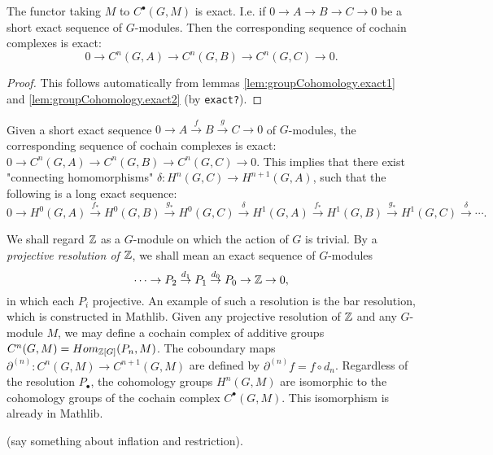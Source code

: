 \begin{lemma}
  The functor taking $M$ to $C^\bullet (G,M)$ is exact.
  I.e. if $0 \to A \to B \to C \to 0$ be a short exact sequence of $G$-modules.
  Then the corresponding sequence of cochain complexes is exact:
  \[
    0 \to C^n(G,A) \to C^n(G,B) \to C^n(G,C) \to 0.
  \]
\end{lemma}

\begin{proof}
  This follows automatically from lemmas \ref{lem:groupCohomology.exact1}
  and \ref{lem:groupCohomology.exact2} (by \texttt{exact?}).
\end{proof}


\begin{definition}
  Given a short exact sequence $0 \to A \stackrel{f}\to B \stackrel{g}\to C \to 0$ of $G$-modules,
  the corresponding sequence of cochain complexes is exact:
  $0 \to C^n(G,A) \to C^n(G,B) \to C^n(G,C) \to 0$.
  This implies that there exist "connecting homomorphisms" $\delta : H^n(G,C) \to H^{n+1}(G,A)$,
  such that the following is a long exact sequence:
  \[
    0 \to H^0(G,A) \stackrel{f_*}\to H^0(G,B) \stackrel{g_*}\to H^0(G,C) \stackrel{\delta}\to
    H^1(G,A) \stackrel{f_*}\to H^1(G,B) \stackrel{g_*} \to H^1(G,C) \stackrel{\delta}\to \cdots.
  \]
\end{definition}



We shall regard ${\mathbb Z}$ as a $G$-module on which the action of $G$ is trivial.
By a \emph{projective resolution of ${\mathbb Z}$}, we shall mean an exact sequence of $G$-modules
\[
  \cdots \to P_2 \stackrel{d_1}\to P_1 \stackrel{d_0}\to P_0 \to {\mathbb Z} \to 0,
\]
in which each $P_i$ projective.
An example of such a resolution is the bar resolution,
which is constructed in Mathlib.
Given any projective resolution of ${\mathbb Z}$ and any $G$-module $M$, we may define a cochain
complex of additive groups $C^n(G,M) = Hom_{{\mathbb Z}[G]}(P_n,M)$. The coboundary maps
$\partial^{(n)} : C^n(G,M) \to C^{n+1}(G,M)$ are defined by $\partial^{(n)} f = f \circ d_n$.
Regardless of the resolution $P_\bullet$,
the cohomology groups $H^n(G,M)$ are isomorphic to the cohomology groups
of the cochain complex $C^\bullet(G,M)$. This isomorphism is already in Mathlib.

(say something about inflation and restriction).





